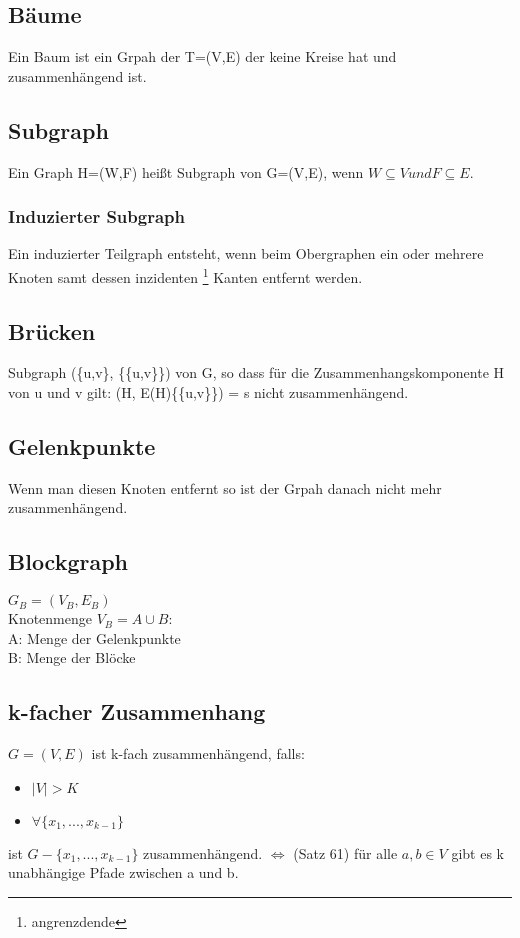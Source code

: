 \documentclass[12pt, letterpaper, twoside]{article}
\begin{document}
\subsection{Bäume}
Ein Baum ist ein Grpah der T=(V,E) der keine Kreise hat und zusammenhängend ist. 

\subsection{Subgraph}
Ein Graph H=(W,F) heißt Subgraph von G=(V,E), wenn $ W \subseteq V und F \subseteq E $.

\subsubsection{Induzierter Subgraph}
Ein induzierter Teilgraph entsteht, wenn beim Obergraphen ein oder mehrere Knoten samt dessen inzidenten \footnote{angrenzdende} Kanten entfernt werden. 

\subsection{Brücken}
Subgraph (\{u,v\}, \{\{u,v\}\}) von G, so dass für die Zusammenhangskomponente H von u und v gilt: (H, E(H)\{\{u,v\}\}) = s nicht zusammenhängend.

\subsection{Gelenkpunkte}
Wenn man diesen Knoten entfernt so ist der Grpah danach nicht mehr zusammenhängend.

\subsection{Blockgraph}
$ G_B =( V_B, E_B) $ \\
Knotenmenge $V_B = A \cup B$: \\
A: Menge der Gelenkpunkte \\
B: Menge der Blöcke

\subsection{k-facher Zusammenhang}
$ G=(V,E) $ ist k-fach zusammenhängend, falls:
	\begin{itemize}
		\item $|V|>K$
		\item $\forall \{x_1,...,x_{k-1}\} $
	\end{itemize}
	ist $G-\{x_1,...,x_{k-1}\}$ zusammenhängend.
	$\Leftrightarrow $ (Satz 61) für alle $a,b \in V$ gibt es k unabhängige Pfade zwischen a und b.
	
\end{document}
